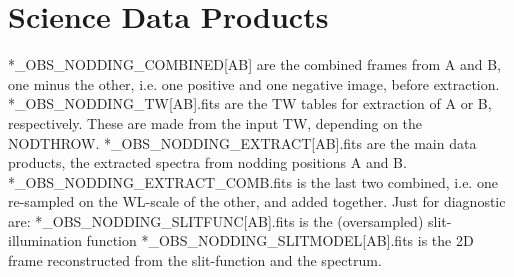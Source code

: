 \section{Science Data Products}

*_OBS_NODDING_COMBINED[AB] are the combined frames from A and B, one minus the other, i.e. one positive and one negative image, before extraction.
*_OBS_NODDING_TW[AB].fits are the TW tables for extraction of A or B, respectively. These are made from the input TW, depending on the NODTHROW.
*_OBS_NODDING_EXTRACT[AB].fits are the main data products, the extracted spectra from nodding positions A and B.
*_OBS_NODDING_EXTRACT_COMB.fits is the last two combined, i.e. one re-sampled on the WL-scale of the other, and added together.
Just for diagnostic are: 
*_OBS_NODDING_SLITFUNC[AB].fits is the (oversampled) slit-illumination function
*_OBS_NODDING_SLITMODEL[AB].fits is the 2D frame reconstructed from the slit-function and the spectrum.